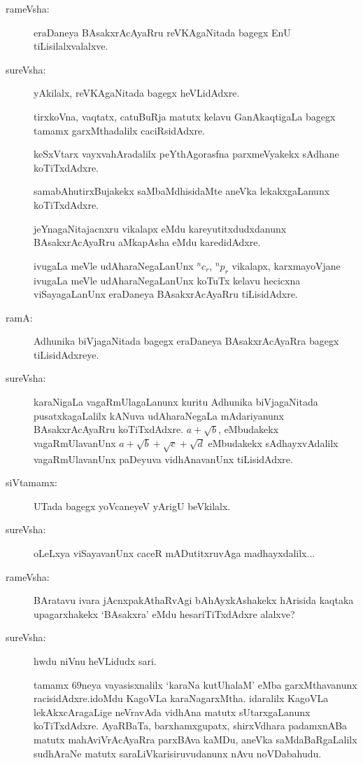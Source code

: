 \begin{description}
\item[rameVsha:] eraDaneya BAsakxrAcAyaRru reVKAgaNitada bagegx EnU tiLisilalxvalalxve.

\item[sureVsha:] yAkilalx, reVKAgaNitada bagegx heVLidAdxre.

tirxkoVna, vaqtatx, catuBuRja matutx kelavu GanAkaqtigaLa bagegx tamamx garxMthadalilx caciRsidAdxre.

keSxVtarx vayxvahAradalilx peYthAgorasfna parxmeVyakekx sAdhane koTiTxdAdxre.

samabAhutirxBujakekx saMbaMdhisidaMte aneVka lekakxgaLanunx koTiTxdAdxre.

jeYnagaNitajacnxru vikalapx eMdu kareyutitxdudxdanunx BAsakxrAcAyaRru aMkapAsha eMdu karedidAdxre.

ivugaLa meVle udAharaNegaLanUnx ${}^{n}c_{r}$, ${}^{n}p_{r}$ vikalapx, karxmayoVjane ivugaLa meVle udAharaNegaLanUnx koTuTx kelavu hecicxna viSayagaLanUnx eraDaneya BAsakxrAcAyaRru tiLisidAdxre.

\item[ramA:] Adhunika biVjagaNitada bagegx eraDaneya BAsakxrAcAyaRra bagegx tiLisi\-dAdxreye.

\item[sureVsha:] karaNigaLa vagaRmUlagaLanunx kuritu Adhunika biVjagaNitada pusatxkagaLalilx kANuva udAharaNegaLa mAdariyanunx BAsakxrAcAyaRru koTiTxdAdxre. $a+\sqrt{b}$, eMbudakekx vagaRmUlavanUnx $a+\sqrt{b}+\sqrt{c}+\sqrt{d}$ eMbudakekx sAdhayxvAdalilx vagaRmUlavanUnx paDeyuva vidhAnavanUnx tiLisidAdxre.

\item[siVtamamx:] UTada bagegx yoVcaneyeV yArigU beVkilalx.

\item[sureVsha:] oLeLxya viSayavanUnx caceR mADutitxruvAga madhayxdalilx...

\item[rameVsha:] BAratavu ivara jAcnxpakAthaRvAgi bAhAyxkAshakekx hArisida kaqtaka upagarxhakekx `BAsakxra' eMdu hesariTiTxdAdxre alalxve?

\item[sureVsha:] hwdu niVnu heVLidudx sari.

tamamx $69$neya vayasisxnalilx `karaNa kutUhalaM' eMba garxMthavanunx racisidAdxre.\break idoMdu KagoVLa karaNagarxMtha. idaralilx KagoVLa lekAkxcAragaLige neVra\-vAda vidhAna matutx sUtarxgaLanunx koTiTxdAdxre. AyaRBaTa, barxhamxgupatx, shirxVdhara\- padamxnABa matutx mahAviVrAcAyaRra parxBAva kaMDu, aneVka saMdaBaR\-gaLalilx sudhAraNe matutx saraLiVkarisiruvudanunx nAvu noVDabahudu.


\end{description}
